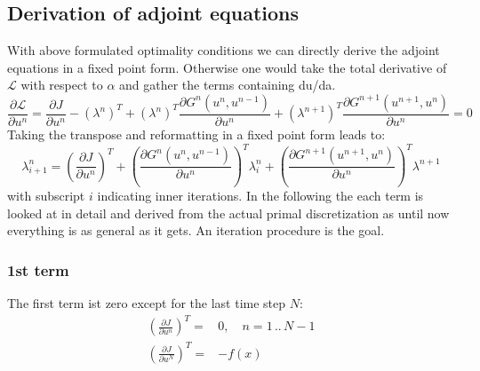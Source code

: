 \subsection{Derivation of adjoint equations}
With above formulated optimality conditions we can directly derive the adjoint equations in a fixed point form. Otherwise one would take the total derivative of $\mathcal{L}$ with respect to $\alpha$ and gather the terms containing du/da.
\begin{equation}
\frac{\partial \mathcal{L}}{\partial u^n} = \frac{\partial J}{\partial u^n} - \left( \lambda^n \right)^T +\left( \lambda^n \right)^T \frac{\partial G^n \left( u^n,u^{n-1} \right)}{\partial u^n} +\left( \lambda^{n+1} \right)^T \frac{\partial G^{n+1}\left( u^{n+1},u^{n} \right)}{\partial u^n}  = 0
\end{equation}
Taking the transpose and reformatting in a fixed point form leads to:
\begin{equation}
\lambda^{n}_{i+1} = \left( \frac{\partial J}{\partial u^n} \right)^T + \left( \frac{\partial G^n\left( u^n,u^{n-1} \right)}{\partial u^n}  \right)^T \lambda^n_i  +\left( \frac{\partial G^{n+1}\left( u^{n+1},u^{n} \right)}{\partial u^n}  \right)^T \lambda^{n+1}
\end{equation}
with subscript $i$ indicating inner iterations. In the following the each term is looked at in detail and derived from the actual primal discretization as until now everything is as general as it gets. An iteration procedure is the goal. 
\subsubsection*{1st term}
The first term ist zero except for the last time step $N$:
\begin{align}
\left( \frac{\partial J}{\partial u^n} \right)^T =& 0,\quad n = 1\,..\,N-1 \\
\left( \frac{\partial J}{\partial u^N} \right)^T =& -f(x) 
\end{align}
